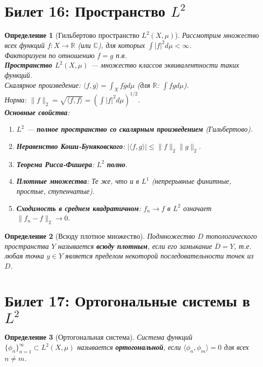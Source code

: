 \documentclass[a4paper, 12pt]{article}
\newtheorem{definition}{Определение}
\newcommand{\R}{\mathbb{R}}
\newcommand{\C}{\mathbb{C}}
\newcommand{\1}{\mathbf{1}}
\begin{document}
\section*{Билет 16: Пространство $L^2$}
\begin{definition}[Гильбертово пространство $L^2(X, \mu)$]
    Рассмотрим множество всех функций $f: X \to \R$ (или $\C$), для которых $\int |f|^2  d\mu < \infty$. \\
    Факторизуем по отношению $f = g$ п.в. \\
    \textbf{Пространство $L^2(X, \mu)$} — множество классов эквивалентности таких функций. \\
    Скалярное произведение: $\langle f, g \rangle = \int_X f \overline{g}  d\mu$ (для $\R$: $\int f g  d\mu$). \\
    Норма: $\|f\|_2 = \sqrt{\langle f, f \rangle} = \left( \int |f|^2  d\mu \right)^{1/2}$. \\
    \textbf{Основные свойства}:
    \begin{enumerate}[label=(\arabic*)]
        \item $L^2$ — \textbf{полное пространство со скалярным произведением} (Гильбертово).
        \item \textbf{Неравенство Коши-Буняковского}: $|\langle f, g \rangle| \leq \|f\|_2 \|g\|_2$.
        \item \textbf{Теорема Рисса-Фишера}: $L^2$ \textbf{полно}.
        \item \textbf{Плотные множества}: Те же, что и в $L^1$ (непрерывные финитные, простые, ступенчатые).
        \item \textbf{Сходимость в среднем квадратичном}: $f_n \to f$ в $L^2$ означает $\|f_n - f\|_2 \to 0$.
    \end{enumerate}
\end{definition}

\begin{definition}[Всюду плотное множество]
    Подмножество $D$ топологического пространства $Y$ называется \textbf{всюду плотным}, если его замыкание $\overline{D} = Y$, т.е. любая точка $y \in Y$ является пределом некоторой последовательности точек из $D$.
\end{definition}

\section*{Билет 17: Ортогональные системы в $L^2$}
\begin{definition}[Ортогональная система]
    Система функций $\{\phi_n\}_{n=1}^{\infty} \subset L^2(X, \mu)$ называется \textbf{ортогональной}, если $\langle \phi_n, \phi_m \rangle = 0$ для всех $n \neq m$.
\end{definition}
\end{document}
